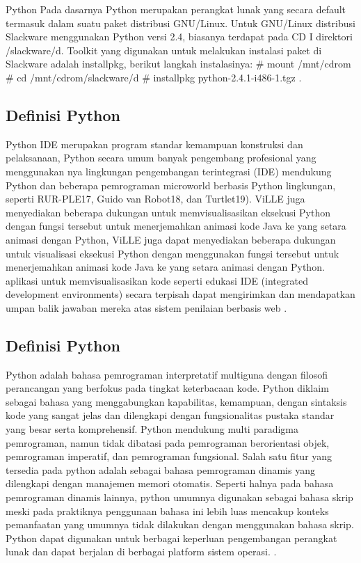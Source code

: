  Python Pada dasarnya Python merupakan perangkat lunak yang secara default termasuk dalam suatu paket distribusi GNU/Linux. Untuk GNU/Linux distribusi Slackware menggunakan Python versi 2.4, biasanya terdapat pada CD I direktori /slackware/d. Toolkit yang digunakan untuk melakukan instalasi paket di Slackware adalah installpkg, berikut langkah instalasinya:
  # mount /mnt/cdrom 
  # cd /mnt/cdrom/slackware/d 
  # installpkg python-2.4.1-i486-1.tgz \cite{utamipemrograman}.

\subsection{Definisi Python}
Python IDE merupakan program standar kemampuan konstruksi dan pelaksanaan, Python secara umum banyak pengembang profesional yang menggunakan nya 
lingkungan pengembangan terintegrasi (IDE) mendukung
Python dan beberapa pemrograman microworld berbasis Python lingkungan, seperti RUR-PLE17, Guido van Robot18, dan Turtlet19). ViLLE juga menyediakan beberapa dukungan untuk memvisualisasikan eksekusi Python dengan fungsi tersebut untuk menerjemahkan animasi kode Java ke yang setara animasi dengan Python, ViLLE  juga dapat menyediakan beberapa dukungan untuk visualisasi eksekusi Python dengan menggunakan fungsi tersebut untuk menerjemahkan animasi kode Java ke yang setara animasi dengan Python. aplikasi untuk memvisualisasikan kode seperti edukasi IDE (integrated development environments) secara terpisah dapat mengirimkan dan mendapatkan umpan balik jawaban mereka atas sistem penilaian berbasis web \cite{helminen2010jype}.

\subsection{Definisi Python}
Python adalah bahasa pemrograman interpretatif multiguna dengan filosofi perancangan yang berfokus pada tingkat keterbacaan kode. Python diklaim sebagai bahasa yang menggabungkan kapabilitas, kemampuan, dengan sintaksis kode yang sangat jelas dan dilengkapi dengan fungsionalitas pustaka standar yang besar serta komprehensif. Python mendukung multi paradigma pemrograman, namun tidak dibatasi pada pemrograman berorientasi objek, pemrograman imperatif, dan pemrograman fungsional. Salah satu fitur yang tersedia pada python adalah sebagai bahasa  
pemrograman dinamis yang dilengkapi dengan manajemen memori otomatis. Seperti halnya pada bahasa pemrograman dinamis lainnya, python umumnya digunakan sebagai bahasa skrip meski pada praktiknya penggunaan bahasa ini lebih luas mencakup konteks pemanfaatan yang umumnya tidak dilakukan dengan menggunakan bahasa skrip. Python dapat digunakan untuk berbagai keperluan pengembangan perangkat lunak dan dapat berjalan di berbagai platform sistem operasi. \cite{rosmalasarana}.


